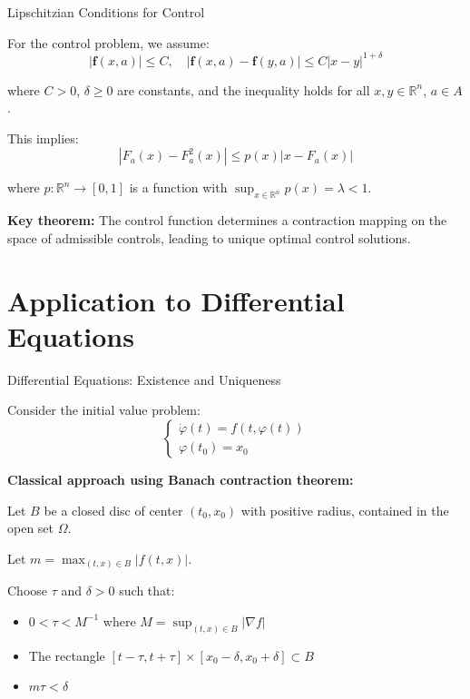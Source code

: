 \documentclass[aspectratio=169,10pt]{beamer}
\begin{document}
\begin{frame}[allowframebreaks]{Lipschitzian Conditions for Control}

For the control problem, we assume:
\begin{equation}
|\mathbf{f}(x,a)| \leq C, \quad |\mathbf{f}(x,a) - \mathbf{f}(y,a)| \leq C|x-y|^{1+\delta} \tag{9.19}
\end{equation}

where $C > 0$, $\delta \geq 0$ are constants, and the inequality holds for all $x, y \in \mathbb{R}^n$, $a \in A$.

This implies:
\begin{equation}
|F_a(x) - F_a^2(x)| \leq p(x)|x - F_a(x)| \tag{9.20}
\end{equation}

where $p : \mathbb{R}^n \to [0,1]$ is a function with $\sup_{x \in \mathbb{R}^n} p(x) = \lambda < 1$.

\vspace{1.5em}

\textbf{Key theorem:} The control function determines a contraction mapping on the space of admissible controls, leading to unique optimal control solutions.

\end{frame}


\section{Application to Differential Equations}

\begin{frame}[allowframebreaks]{Differential Equations: Existence and Uniqueness}

Consider the initial value problem:
\begin{equation}
\begin{cases}
\dot{\varphi}(t) = f(t, \varphi(t)) \\
\varphi(t_0) = x_0
\end{cases} \tag{9.39}
\end{equation}

\textbf{Classical approach using Banach contraction theorem:}

Let $B$ be a closed disc of center $(t_0, x_0)$ with positive radius, contained in the open set $\Omega$.

Let $m = \max_{(t,x) \in B} |f(t,x)|$.

Choose $\tau$ and $\delta > 0$ such that:
\begin{itemize}
  \item $0 < \tau < M^{-1}$ where $M = \sup_{(t,x) \in B} |\nabla f|$
  \item The rectangle $[t - \tau, t + \tau] \times [x_0 - \delta, x_0 + \delta] \subset B$
  \item $m\tau < \delta$
\end{itemize}

\end{frame}
\end{document}
